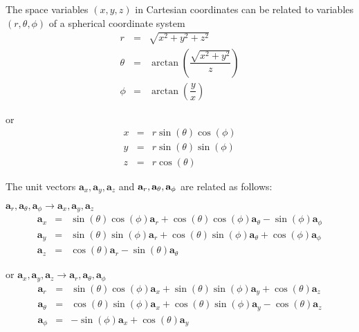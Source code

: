 \documentclass{article}
\begin{document}
The space variables $\left( x,y,z\right) $ in Cartesian coordinates can be
related to variables $\left( r,\theta ,\phi \right) $ of a spherical
coordinate system 
\begin{eqnarray*}
r &=&\sqrt{x^{2}+y^{2}+z^{2}} \\
\theta &=&\arctan \left( \dfrac{\sqrt{x^{2}+y^{2}}}{z}\right) \\
\phi &=&\arctan \left( \dfrac{y}{x}\right)
\end{eqnarray*}

or 
\begin{eqnarray*}
x &=&r\sin \left( \theta \right) \cos \left( \phi \right) \\
y &=&r\sin \left( \theta \right) \sin \left( \phi \right) \\
z &=&r\cos \left( \theta \right)
\end{eqnarray*}

The unit vectors $\mathbf{a}_{x},\mathbf{a}_{y},\mathbf{a}_{z}$ and $\mathbf{%
a}_{r},\mathbf{a}_{\theta },\mathbf{a}_{\phi }$ are related as follows:

$\mathbf{a}_{r},\mathbf{a}_{\theta },\mathbf{a}_{\phi }\longrightarrow 
\mathbf{a}_{x},\mathbf{a}_{y},\mathbf{a}_{z}$ 
\begin{eqnarray*}
\mathbf{a}_{x} &=&\sin \left( \theta \right) \cos \left( \phi \right) 
\mathbf{a}_{r}+\cos \left( \theta \right) \cos \left( \phi \right) \mathbf{a}%
_{\theta }-\sin \left( \phi \right) \mathbf{a}_{\phi } \\
\mathbf{a}_{y} &=&\sin \left( \theta \right) \sin \left( \phi \right) 
\mathbf{a}_{r}+\cos \left( \theta \right) \sin \left( \phi \right) \mathbf{a}%
_{\theta }+\cos \left( \phi \right) \mathbf{a}_{\phi } \\
\mathbf{a}_{z} &=&\cos \left( \theta \right) \mathbf{a}_{r}-\sin \left(
\theta \right) \mathbf{a}_{\theta }
\end{eqnarray*}

or $\mathbf{a}_{x},\mathbf{a}_{y},\mathbf{a}_{z}\longrightarrow \mathbf{a}%
_{r},\mathbf{a}_{\theta },\mathbf{a}_{\phi }$ 
\begin{eqnarray*}
\mathbf{a}_{r} &=&\sin \left( \theta \right) \cos \left( \phi \right) 
\mathbf{a}_{x}+\sin \left( \theta \right) \sin \left( \phi \right) \mathbf{a}%
_{y}+\cos \left( \theta \right) \mathbf{a}_{z} \\
\mathbf{a}_{\theta } &=&\cos \left( \theta \right) \sin \left( \phi \right) 
\mathbf{a}_{x}+\cos \left( \theta \right) \sin \left( \phi \right) \mathbf{a}%
_{y}-\cos \left( \theta \right) \mathbf{a}_{z} \\
\mathbf{a}_{\phi } &=&-\sin \left( \phi \right) \mathbf{a}_{x}+\cos \left(
\theta \right) \mathbf{a}_{y}
\end{eqnarray*}
\end{document}
